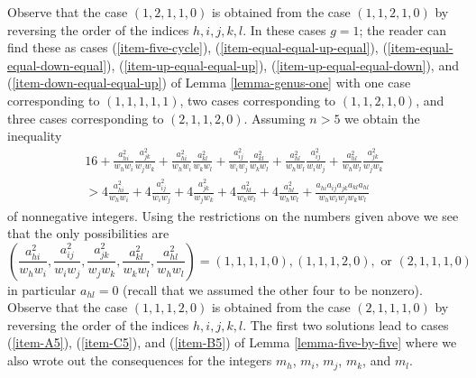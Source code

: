 \documentclass{stacks-project}
\theoremstyle{plain}
\theoremstyle{definition}
\theoremstyle{remark}
\numberwithin{equation}{subsection}
\begin{document}
Observe that the case $(1, 2, 1, 1, 0)$ is obtained from the case
$(1, 1, 2, 1, 0)$ by reversing the order of the indices $h, i, j, k, l$.
In these cases $g = 1$; the reader can find these as cases
(\ref{item-five-cycle}),
(\ref{item-equal-equal-up-equal}), (\ref{item-equal-equal-down-equal}),
(\ref{item-up-equal-equal-up}), (\ref{item-up-equal-equal-down}), and
(\ref{item-down-equal-equal-up}) of Lemma \ref{lemma-genus-one}
with one case corresponding to $(1, 1, 1, 1, 1)$,
two cases corresponding to $(1, 1, 2, 1, 0)$, and
three cases corresponding to $(2, 1, 1, 2, 0)$.
Assuming $n > 5$ we obtain the inequality
\begin{align*}
16 + 
\frac{a_{hi}^2}{w_hw_i}\frac{a_{jk}^2}{w_jw_k} +
\frac{a_{hi}^2}{w_hw_i}\frac{a_{kl}^2}{w_kw_l} +
\frac{a_{ij}^2}{w_iw_j}\frac{a_{kl}^2}{w_kw_l} +
\frac{a_{hl}^2}{w_hw_l}\frac{a_{ij}^2}{w_iw_j} +
\frac{a_{hl}^2}{w_hw_l}\frac{a_{jk}^2}{w_jw_k} \\
> 4\frac{a_{hi}^2}{w_hw_i} +
4\frac{a_{ij}^2}{w_iw_j} +
4\frac{a_{jk}^2}{w_jw_k} +
4\frac{a_{kl}^2}{w_kw_l} +
4\frac{a_{hl}^2}{w_hw_l} +
\frac{a_{hi}a_{ij}a_{jk}a_{kl}a_{hl}}{w_hw_iw_jw_kw_l}
\end{align*}
of nonnegative integers.  Using the restrictions on the numbers given above
we see that the only possibilities are
$$
(\frac{a_{hi}^2}{w_hw_i}, \frac{a_{ij}^2}{w_iw_j},
\frac{a_{jk}^2}{w_jw_k}, \frac{a_{kl}^2}{w_kw_l}, \frac{a_{hl}^2}{w_hw_l}) =
(1, 1, 1, 1, 0), (1, 1, 1, 2, 0), \text{ or } (2, 1, 1, 1, 0)
$$
in particular $a_{hl} = 0$ (recall that we assumed the other four
to be nonzero). Observe that the case $(1, 1, 1, 2, 0)$
is obtained from the case $(2, 1, 1, 1, 0)$ by reversing the order
of the indices $h, i, j, k, l$. The first two solutions lead to
cases (\ref{item-A5}), (\ref{item-C5}), and (\ref{item-B5}) of
Lemma \ref{lemma-five-by-five} where we also wrote out the
consequences for the integers $m_h$, $m_i$, $m_j$, $m_k$, and $m_l$.
\end{document}

